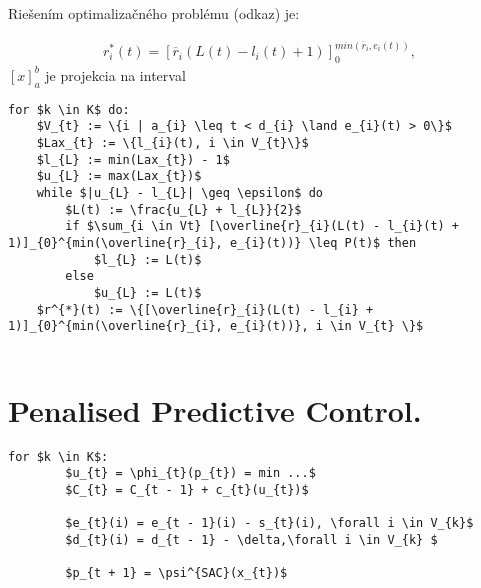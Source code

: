 Riešením optimalizačného problému (odkaz) je:

\begin{align}
r^{*}_{i}(t) = [\overline{r}_{i}(L(t) - l_{i}(t) + 1   )]_{0}^{min(\overline{r}_{i}, e_{i}(t))},
\end{align}
$[x]_{a}^{b}$ je projekcia na interval 


\begin{lstlisting}[caption={Pseudokód online algoritmu sLLF.},captionpos=b,mathescape=true]
for $k \in K$ do:
    $V_{t} := \{i | a_{i} \leq t < d_{i} \land e_{i}(t) > 0\}$
    $Lax_{t} := \{l_{i}(t), i \in V_{t}\}$
    $l_{L} := min(Lax_{t}) - 1$
    $u_{L} := max(Lax_{t})$
    while $|u_{L} - l_{L}| \geq \epsilon$ do
        $L(t) := \frac{u_{L} + l_{L}}{2}$
        if $\sum_{i \in Vt} [\overline{r}_{i}(L(t) - l_{i}(t) + 1)]_{0}^{min(\overline{r}_{i}, e_{i}(t))} \leq P(t)$ then
            $l_{L} := L(t)$
        else
            $u_{L} := L(t)$
    $r^{*}(t) := \{[\overline{r}_{i}(L(t) - l_{i} + 1)]_{0}^{min(\overline{r}_{i}, e_{i}(t))}, i \in V_{t} \}$


\end{lstlisting}



\section{Penalised Predictive Control.}






\begin{lstlisting}[caption={Pseudokód koordinácie agregátora a systémového operátora.},captionpos=b,mathescape=true]
    for $k \in K$:
        $u_{t} = \phi_{t}(p_{t}) = min ...$
        $C_{t} = C_{t - 1} + c_{t}(u_{t})$

        $e_{t}(i) = e_{t - 1}(i) - s_{t}(i), \forall i \in V_{k}$
        $d_{t}(i) = d_{t - 1} - \delta,\forall i \in V_{k} $

        $p_{t + 1} = \psi^{SAC}(x_{t})$
\end{lstlisting}

